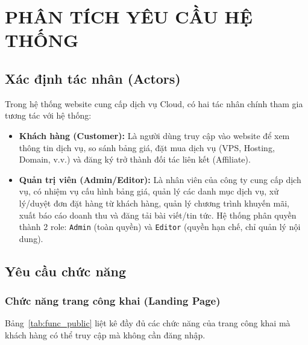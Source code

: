 \chapter{PHÂN TÍCH YÊU CẦU HỆ THỐNG}

\section{Xác định tác nhân (Actors)}
Trong hệ thống website cung cấp dịch vụ Cloud, có hai tác nhân chính tham gia tương tác với hệ thống:
\begin{itemize}
    \item \textbf{Khách hàng (Customer):} Là người dùng truy cập vào website để xem thông tin dịch vụ, so sánh bảng giá, đặt mua dịch vụ (VPS, Hosting, Domain, v.v.) và đăng ký trở thành đối tác liên kết (Affiliate).
    \item \textbf{Quản trị viên (Admin/Editor):} Là nhân viên của công ty cung cấp dịch vụ, có nhiệm vụ cấu hình bảng giá, quản lý các danh mục dịch vụ, xử lý/duyệt đơn đặt hàng từ khách hàng, quản lý chương trình khuyến mãi, xuất báo cáo doanh thu và đăng tải bài viết/tin tức. Hệ thống phân quyền thành 2 role: \texttt{Admin} (toàn quyền) và \texttt{Editor} (quyền hạn chế, chỉ quản lý nội dung).
\end{itemize}

\section{Yêu cầu chức năng}

\subsection{Chức năng trang công khai (Landing Page)}
Bảng~\ref{tab:func_public} liệt kê đầy đủ các chức năng của trang công khai mà khách hàng có thể truy cập mà không cần đăng nhập.

